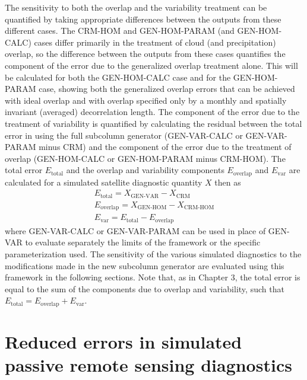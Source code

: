 The sensitivity to both the overlap and the variability treatment can be
quantified by taking appropriate differences between the outputs from
these different cases. The CRM-HOM and GEN-HOM-PARAM (and GEN-HOM-CALC)
cases differ primarily in the treatment of cloud (and precipitation)
overlap, so the difference between the outputs from these cases
quantifies the component of the error due to the generalized overlap
treatment alone. This will be calculated for both the GEN-HOM-CALC case
and for the GEN-HOM-PARAM case, showing both the generalized overlap
errors that can be achieved with ideal overlap and with overlap
specified only by a monthly and spatially invariant (averaged)
decorrelation length. The component of the error due to the treatment of
variability is quantified by calculating the residual between the total
error in using the full subcolumn generator (GEN-VAR-CALC or
GEN-VAR-PARAM minus CRM) and the component of the error due to the
treatment of overlap (GEN-HOM-CALC or GEN-HOM-PARAM minus CRM-HOM). The
total error \(E_\textrm{total}\) and the overlap and variability
components \(E_\textrm{overlap}\) and \(E_\textrm{var}\) are calculated
for a simulated satellite diagnostic quantity \(X\) then as
\[\begin{gathered} 
    E_\textrm{total} = X_\textrm{GEN-VAR} - X_\textrm{CRM} \\ 
    E_\textrm{overlap} = X_\textrm{GEN-HOM} - X_\textrm{CRM-HOM} \\ 
    E_\textrm{var} = E_\textrm{total} - E_\textrm{overlap}
\end{gathered}\] where GEN-VAR-CALC or GEN-VAR-PARAM can be used in
place of GEN-VAR to evaluate separately the limits of the framework or
the specific parameterization used. The sensitivity of the various
simulated diagnostics to the modifications made in the new subcolumn
generator are evaluated using this framework in the following sections.
Note that, as in Chapter 3, the total error is equal to the sum of the
components due to overlap and variability, such that
\(E_\textrm{total} = E_\textrm{overlap} + E_\textrm{var}\).

\section{Reduced errors in simulated passive remote sensing
diagnostics}\label{sec:subgrid2Passive}

